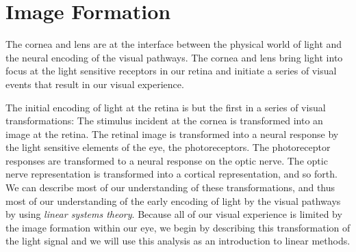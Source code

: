 
\chapter{Image Formation}
\label{chapter:imageformation}
\pagestyle{headings}  

The cornea and lens are at the interface between
the physical world of light
and the neural encoding of the visual pathways.
The cornea and lens bring light
into focus at the light sensitive receptors in our retina
and initiate a series of visual
events that result in our visual experience.

The initial encoding of light at the retina is
but the first in a series of visual transformations:
The stimulus incident at the cornea
is transformed into an image at the retina.
The retinal image is transformed into a neural response by the
light sensitive elements of the eye, the photoreceptors.
The photoreceptor responses are transformed to
a neural response on the optic nerve.
The optic nerve representation is transformed into a
cortical representation, and so forth.
We can describe most of our understanding
of these transformations, and thus most of our understanding
of the early encoding of light by the visual pathways
by using {\em linear systems theory}.
Because all of our visual experience is limited by the 
image formation within our eye,
we begin by describing this transformation of the light signal
and we will use this analysis as an introduction to linear methods.

